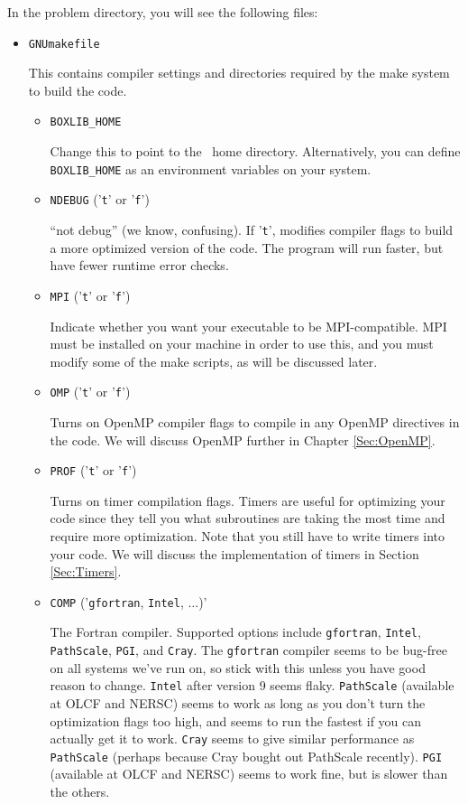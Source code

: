 In the problem directory, you will see the following files:
\begin{itemize}
\item {\tt GNUmakefile}

This contains compiler settings and directories required by the make system to build the code.

  \begin{itemize}

    \item {\tt BOXLIB\_HOME}

    Change this to point to the \BoxLib\ home directory.  Alternatively, you can define {\tt BOXLIB\_HOME}
    as an environment variables on your system.

    \item {\tt NDEBUG} ('{\tt t}' or '{\tt f}')
      
    ``not debug'' (we know, confusing).  If '{\tt t}', modifies compiler flags to build a 
    more optimized version of the code.  The program will run faster, but have fewer 
    runtime error checks.

    \item {\tt MPI} ('{\tt t}' or '{\tt f}')

    Indicate whether you want your executable to be MPI-compatible.  MPI must be installed on your
    machine in order to use this, and you must modify some of the make scripts, as will be 
    discussed later.

    \item {\tt OMP} ('{\tt t}' or '{\tt f}')

    Turns on OpenMP compiler flags to compile in any OpenMP directives in the code.
    We will discuss OpenMP further in Chapter \ref{Sec:OpenMP}.

    \item {\tt PROF} ('{\tt t}' or '{\tt f}')

    Turns on timer compilation flags.  Timers are useful for optimizing your code since they tell you 
    what subroutines are taking the most time and require more optimization.  Note that you still have 
    to write timers into your code.  We will discuss the implementation of timers in Section \ref{Sec:Timers}.

    \item {\tt COMP} ('{\tt gfortran}, {\tt Intel}, $\ldots$)'

    The Fortran compiler.  Supported options include {\tt gfortran}, {\tt Intel}, 
    {\tt PathScale}, {\tt PGI}, and {\tt Cray}.  The {\tt gfortran} compiler seems to be 
    bug-free on all systems we've run on, so stick with this unless you have good reason to 
    change.  {\tt Intel} after version 9 seems flaky.  {\tt PathScale} (available 
    at OLCF and NERSC) seems to work as long as you don't turn the optimization flags 
    too high, and seems to run the fastest if you can actually get it to work.  
    {\tt Cray} seems to give similar performance as {\tt PathScale} (perhaps
    because Cray bought out PathScale recently).  {\tt PGI} (available at OLCF and NERSC) 
    seems to work fine, but is slower than the others.


\end{itemize}
\end{itemize}
